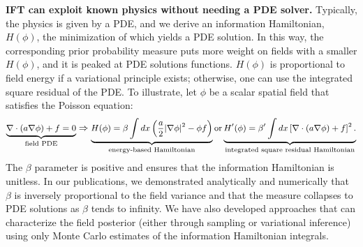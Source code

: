 \textbf{IFT can exploit known physics without needing a PDE solver.}
Typically, the physics is given by a PDE, and we derive an information Hamiltonian, $H(\phi)$, the minimization of which yields a PDE solution.
In this way, the corresponding prior probability measure puts more weight on fields with a smaller $H(\phi)$, and it is peaked at PDE solutions functions.
$H(\phi)$ is proportional to field energy if a variational principle exists; otherwise, one can use the integrated square residual of the PDE.
To illustrate, let $\phi$ be a scalar spatial field that satisfies the Poisson equation:
\begin{equation}
\small
\label{eqn:prior_hamiltonian}
\underbrace{\nabla\cdot \left(a\nabla \phi\right) + f = 0}_{\text{field PDE}}\Rightarrow
\underbrace{H(\phi) = \beta \int dx 
\left(\frac{a}{2}|\nabla\phi|^2 - \phi f\right)}_{\text{energy-based Hamiltonian}}\text{or}
\underbrace{H'(\phi) = \beta'\int dx \left[\nabla\cdot \left(a\nabla \phi\right) + f\right]^2.}_{\text{integrated square residual Hamiltonian}}
\end{equation}
The $\beta$ parameter is positive and ensures that the information Hamiltonian is unitless.
In our publications, we demonstrated analytically and numerically that $\beta$ is inversely proportional to the field variance and that the measure collapses to PDE solutions as $\beta$ tends to infinity.
We have also developed approaches that can characterize the field posterior (either through sampling or variational inference) using only Monte Carlo estimates of the information Hamiltonian integrals.

